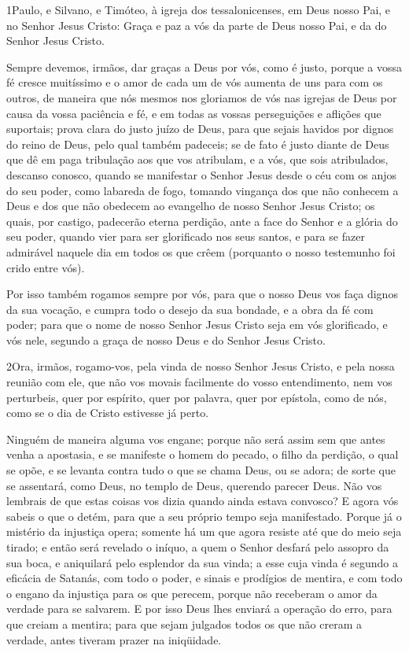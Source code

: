 
\lettrine{1} Paulo, e Silvano, e Timóteo, à igreja dos
tessalonicenses, em Deus nosso Pai, e no Senhor Jesus Cristo:
Graça e paz a vós da parte de Deus nosso Pai, e da do Senhor
Jesus Cristo.

Sempre devemos, irmãos, dar graças a Deus por vós, como é justo,
porque a vossa fé cresce muitíssimo e o amor de cada um de vós
aumenta de uns para com os outros, de maneira que nós mesmos nos
gloriamos de vós nas igrejas de Deus por causa da vossa paciência e
fé, e em todas as vossas perseguições e aflições que suportais;
prova clara do justo juízo de Deus, para que sejais havidos por
dignos do reino de Deus, pelo qual também padeceis; se de fato é
justo diante de Deus que dê em paga tribulação aos que vos
atribulam, e a vós, que sois atribulados, descanso conosco,
quando se manifestar o Senhor Jesus desde o céu com os anjos do seu
poder, como labareda de fogo, tomando vingança dos que não
conhecem a Deus e dos que não obedecem ao evangelho de nosso Senhor
Jesus Cristo; os quais, por castigo, padecerão eterna perdição,
ante a face do Senhor e a glória do seu poder, quando vier
para ser glorificado nos seus santos, e para se fazer admirável
naquele dia em todos os que crêem (porquanto o nosso testemunho foi
crido entre vós).

Por isso também rogamos sempre por vós, para que o nosso Deus vos
faça dignos da sua vocação, e cumpra todo o desejo da sua bondade, e
a obra da fé com poder; para que o nome de nosso Senhor Jesus
Cristo seja em vós glorificado, e vós nele, segundo a graça de nosso
Deus e do Senhor Jesus Cristo.

\medskip

\lettrine{2} Ora, irmãos, rogamo-vos, pela vinda de nosso
Senhor Jesus Cristo, e pela nossa reunião com ele, que não vos
movais facilmente do vosso entendimento, nem vos perturbeis, quer
por espírito, quer por palavra, quer por epístola, como de nós, como
se o dia de Cristo estivesse já perto.

Ninguém de maneira alguma vos engane; porque não será assim sem
que antes venha a apostasia, e se manifeste o homem do pecado, o
filho da perdição, o qual se opõe, e se levanta contra tudo o
que se chama Deus, ou se adora; de sorte que se assentará, como
Deus, no templo de Deus, querendo parecer Deus. Não vos lembrais
de que estas coisas vos dizia quando ainda estava convosco? E
agora vós sabeis o que o detém, para que a seu próprio tempo seja
manifestado. Porque já o mistério da injustiça opera; somente há
um que agora resiste até que do meio seja tirado; e então será
revelado o iníquo, a quem o Senhor desfará pelo assopro da sua boca,
e aniquilará pelo esplendor da sua vinda; a esse cuja vinda é
segundo a eficácia de Satanás, com todo o poder, e sinais e
prodígios de mentira, e com todo o engano da injustiça para
os que perecem, porque não receberam o amor da verdade para se
salvarem. E por isso Deus lhes enviará a operação do erro,
para que creiam a mentira; para que sejam julgados todos os
que não creram a verdade, antes tiveram prazer na iniqüidade.

